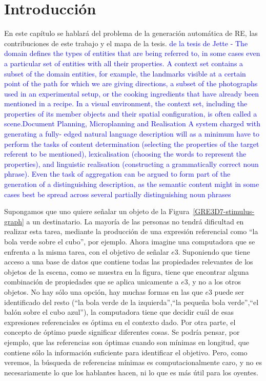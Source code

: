 \chapter{Introducci\'on}


En este cap\'itulo se hablar\'a del problema de la generaci\'on autom\'atica de RE, las contribuciones de este trabajo y el mapa de la tesis.
\textcolor{blue}{de la tesis de Jette - The domain defines the types of entities that are being referred to, in some
cases even a particular set of entities with all their properties. A
context set
contains a subset of the domain entities, for example, the landmarks visible at a certain point of the path for which we are giving directions, a
subset of the photographs used in an experimental setup, or the cooking ingredients that have already been mentioned in a recipe. In a visual environment, the context set, including the
properties of its member objects and their spatial configuration, is often called  a scene.Document Planning, Microplanning and Realisation  A system charged
with generating a fully- edged natural language description will as a minimum
have to perform the tasks of content determination (selecting the properties of the
target referent to be mentioned), lexicalisation (choosing the words to represent
the properties), and linguistic realisation (constructing a grammatically correct
noun phrase). Even the task of aggregation can be argued to form part of the
generation of a distinguishing description, as the semantic content might in some
cases best be spread across several partially distinguishing noun phrases}

Supongamos que uno quiere se\~nalar un objeto de la Figura~\ref{GRE3D7-stimulus-graph} a un destinatario. La mayor\'{i}a de las personas
no tendr\'a dificultad en realizar esta tarea, mediante la producci\'on de una expresi\'on referencial como ``la
bola verde sobre el cubo'', por ejemplo. Ahora imagine una computadora que se enfrenta a la misma
tarea, con el objetivo de se\~nalar $e3$. Suponiendo que tiene acceso a una base de datos que contiene todas
las propiedades relevantes de los objetos de la escena, como se muestra en la figura, tiene que encontrar alguna
combinaci\'on de propiedades que se aplica unicamente a $e3$, y no a los otros objetos. No hay s\'olo una opci\'on,
hay muchas formas en las que $e3$ puede ser identificado del resto (``la bola verde de la izquierda'',``la peque\~na bola verde'',``el bal\'on sobre el cubo azul''), la computadora tiene que decidir cu\'al de esas expresiones referenciales es \'optima en el contexto dado. Por otra parte, el concepto de \'optimo puede significar diferentes cosas.
Se podr\'{i}a pensar, por ejemplo, que las referencias son \'optimas cuando son m\'{i}nimas en longitud,
que contiene s\'olo la informaci\'on suficiente para identificar el objetivo. Pero, como veremos, la b\'usqueda de referencias m\'{i}nimas
es computacionalmente caro, y no es necesariamente lo que los hablantes hacen, ni lo que es m\'as \'util para los oyentes.


